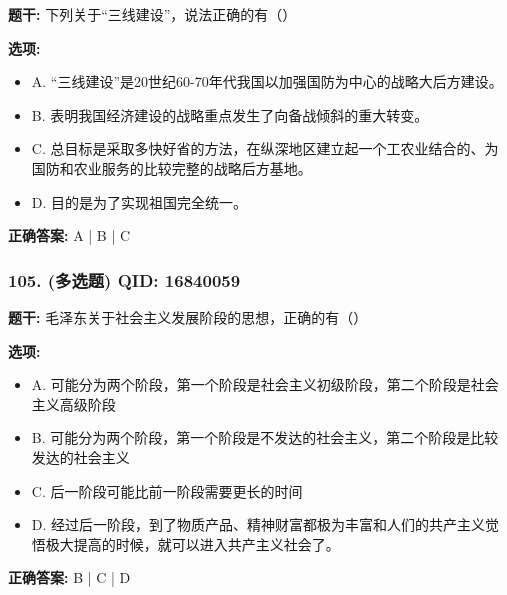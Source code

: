 \documentclass[12pt,UTF8]{ctexart}
\begin{document}
\textbf{题干:}
下列关于“三线建设”，说法正确的有（）

\textbf{选项:}
\begin{itemize}[leftmargin=*]

  \item A. “三线建设”是20世纪60-70年代我国以加强国防为中心的战略大后方建设。

  \item B. 表明我国经济建设的战略重点发生了向备战倾斜的重大转变。

  \item C. 总目标是采取多快好省的方法，在纵深地区建立起一个工农业结合的、为国防和农业服务的比较完整的战略后方基地。

  \item D. 目的是为了实现祖国完全统一。

\end{itemize}

\textbf{正确答案:}
A | B | C

\vspace{0.3em}\hrulefill\vspace{0.7em}

\subsubsection*{105. (多选题) \small QID: 16840059}

\textbf{题干:}
毛泽东关于社会主义发展阶段的思想，正确的有（）

\textbf{选项:}
\begin{itemize}[leftmargin=*]

  \item A. 可能分为两个阶段，第一个阶段是社会主义初级阶段，第二个阶段是社会主义高级阶段

  \item B. 可能分为两个阶段，第一个阶段是不发达的社会主义，第二个阶段是比较发达的社会主义

  \item C. 后一阶段可能比前一阶段需要更长的时间

  \item D. 经过后一阶段，到了物质产品、精神财富都极为丰富和人们的共产主义觉悟极大提高的时候，就可以进入共产主义社会了。

\end{itemize}

\textbf{正确答案:}
B | C | D

\vspace{0.3em}\hrulefill\vspace{0.7em}
\end{document}
